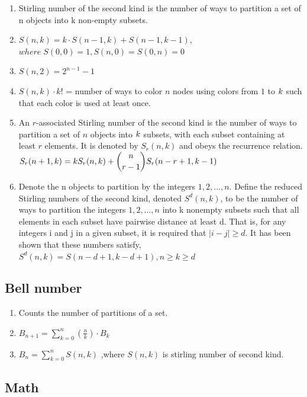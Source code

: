 \begin{enumerate}[resume]
    \item Stirling number of the second kind is the number of ways to partition a set of n objects into k non-empty subsets.
    \item $S(n,k)=k \cdot S(n-1,k)+S(n-1,k-1)$,
    \(where \; S(0,0)=1,S(n,0)=S(0,n)=0\)
    \item $S(n,2)=2^{n-1}-1$
    \item $S(n,k) \cdot k!$ = number of ways to color $n$ nodes using colors from $\displaystyle 1$ to $\displaystyle \displaystyle k$ such that each color is used at least once.
    \item An $r$-associated Stirling number of the second kind is the number of ways to partition a set of $n$ objects into $\displaystyle \displaystyle k$ subsets, with each subset containing at least $r$ elements. It is denoted by $S_r( n , k )$ and obeys the recurrence relation.
    $\displaystyle \displaystyle S_r(n+1,k) = k S_r(n,k) + \binom{n}{r-1} S_r(n-r+1,k-1)$
    \item Denote the n objects to partition by the integers $\displaystyle 1, 2, \dots, n$. Define the reduced Stirling numbers of the second kind, denoted $S^d(n, k)$, to be the number of ways to partition the integers $\displaystyle 1, 2, \dots, n$ into k nonempty subsets such that all elements in each subset have pairwise distance at least d.
    That is, for any integers i and j in a given subset, it is required that $|i - j| \geq d$. It has been shown that these numbers satisfy,
    \(S^d(n, k) = S(n - d + 1, k - d + 1), n \geq k \geq d\)
\end{enumerate}

\subsection{Bell number}

\begin{enumerate}[resume]
    \item Counts the number of partitions of a set.
    \item $B_{n+1}=\displaystyle\sum_{k=0}^{n}\left(\frac{n}{k}\right) \cdot B_{k}$
    \item $B_{n}=\displaystyle\sum_{k=0}^{n}S(n,k)$ ,where $S(n,k)$ is stirling number of second kind.
\end{enumerate}

\subsection{Math}

